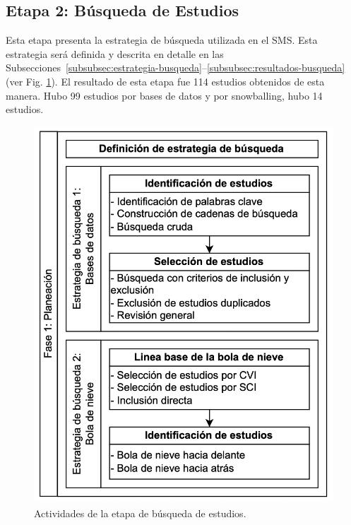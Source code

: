 \newcommand{\totalStudies}{114}
\newcommand{\databaseStudies}{99}
\newcommand{\snowballStudies}{14}
\newcommand{\directInclusionStudies}{0}




\subsection{Etapa 2: Búsqueda de Estudios}

Esta etapa presenta la estrategia de búsqueda utilizada en el SMS\@. Esta estrategia será definida y descrita en detalle en las Subsecciones~\ref{subsubsec:estrategia-busqueda}--\ref{subsubsec:resultados-busqueda} (ver Fig. \ref{fig:busqueda-estudios}).
El resultado de esta etapa fue \totalStudies{} estudios obtenidos de esta manera. Hubo \databaseStudies{} estudios por bases de datos y por snowballing, hubo \snowballStudies{} estudios.


\begin{figure}[htbp]
	\centering
	\vspace{10pt}
	\includegraphics[scale=0.3]{resources/figures/fig03-fase1-planeacion.png}
	\vspace{6pt}
	\caption{Actividades de la etapa de búsqueda de estudios.}
	\label{fig:busqueda-estudios}
\end{figure}

